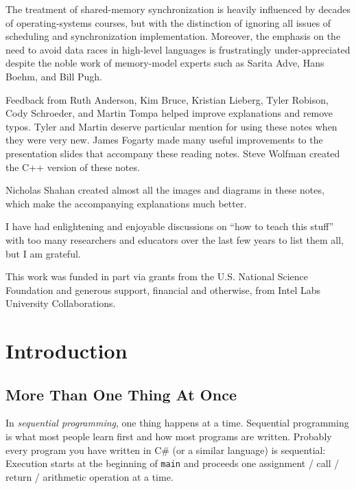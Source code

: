 \documentclass[10pt]{article}
\begin{document}
The treatment of shared-memory synchronization is heavily influenced
by decades of operating-systems courses, but with the distinction of
ignoring all issues of scheduling and synchronization implementation.
Moreover, the emphasis on the need to avoid data races in high-level
languages is frustratingly under-appreciated despite the noble work of
memory-model experts such as Sarita Adve, Hans Boehm, and Bill Pugh.

Feedback from Ruth Anderson, Kim Bruce, Kristian Lieberg, Tyler
Robison, Cody Schroeder, and Martin Tompa helped improve explanations
and remove typos.  Tyler and Martin deserve particular mention for
using these notes when they were very new.  James Fogarty made many
useful improvements to the presentation slides that accompany these
reading notes.  Steve Wolfman created the C++ version of these notes.

Nicholas Shahan created almost all the images and diagrams in these
notes, which make the accompanying explanations much better.

I have had enlightening and enjoyable discussions on ``how to teach this
stuff'' with too many researchers and educators over the last few
years to list them all, but I am grateful.

This work was funded in part via grants from the U.S. National Science
Foundation and generous support, financial and otherwise, from Intel
Labs University Collaborations.

\section{Introduction}
\label{sec:intro}

\subsection{More Than One Thing At Once}

In \emph{sequential programming}, one thing happens at a time.
Sequential programming is what most people learn first and how most
programs are written.  Probably every program you have written in C\#
(or a similar language) is sequential: Execution starts at the
beginning of \texttt{main} and proceeds one assignment / call / return
/ arithmetic operation at a time.
\end{document}
